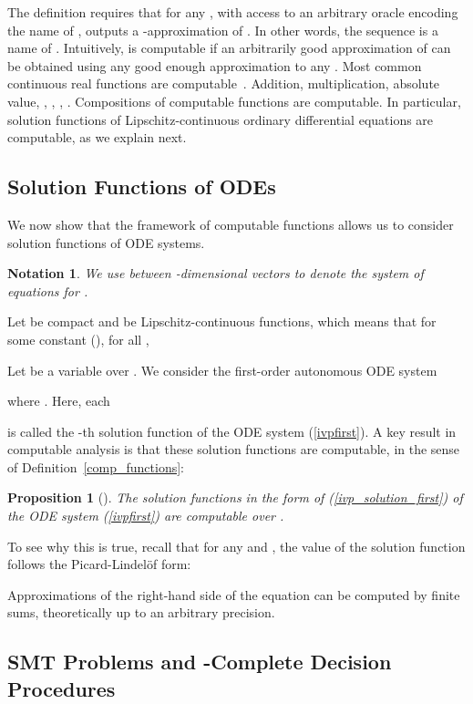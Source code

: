 \documentclass[12pt]{article}
\newtheorem{proposition}[theorem]{Proposition}
\newtheorem{notation}[theorem]{Notation}
\begin{document}
The definition requires that for any , with access to an arbitrary oracle encoding the name  of ,  outputs a -approximation of . In other words, the sequence  is a name of . Intuitively,  is computable if an arbitrarily good approximation of  can be obtained using any good enough approximation to any .
Most common continuous real functions are computable~\cite{CAbook}. Addition, multiplication, absolute value, , , , . Compositions of computable functions are computable. In particular, solution functions of Lipschitz-continuous ordinary differential equations are computable, as we explain next. 

\subsection{Solution Functions of ODEs}

We now show that the framework of computable functions allows us to consider solution functions of ODE systems.
\begin{notation}
We use  between -dimensional vectors to denote the system of equations  for .
\end{notation}
Let  be compact and  be  Lipschitz-continuous functions, which means that for some constant  (), for all
 ,

Let  be a variable over . We consider the first-order autonomous ODE system

where . Here, each

is called the -th solution function of the ODE system (\ref{ivpfirst}). A key result in computable analysis is that these solution functions are computable, in the sense of Definition~\ref{comp_functions}: 
\begin{proposition}[\cite{Kobook}]
The solution functions  in the form of (\ref{ivp_solution_first}) of the ODE system (\ref{ivpfirst}) are computable over .
\end{proposition}
To see why this is true, recall that for any  and , the value of the solution function follows the Picard-Lindel\"of form:

Approximations of the right-hand side of the equation can be computed by finite sums, theoretically up to an arbitrary precision.

\subsection{SMT Problems and -Complete Decision Procedures}
\end{document}
